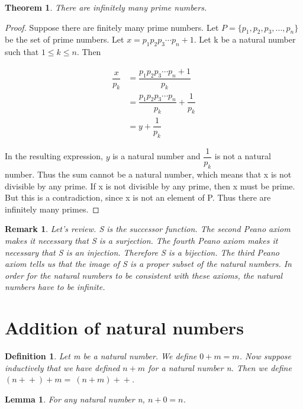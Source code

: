 \documentclass{article}
\newtheorem{definition}{Definition}
\newtheorem{lemma}{Lemma}
\newtheorem{theorem}{Theorem}
\newtheorem{remark}{Remark}
\newcommand{\inc}[1]{#1\!+\!+}
\begin{document}
\begin{theorem}
There are infinitely many prime numbers.
\end{theorem}

\begin{proof}
Suppose there are finitely many prime numbers. Let $P = \{p_{1}, p_{2}, p_{3}, ... ,p_{n}\}$ be the set of prime numbers. Let $x = p_{1}p_{2}p_{3} \dotsm p_{n} + 1$. Let k be a natural number such that $1 \leq k \leq n$. Then 

\begin{align*}
\dfrac{x}{p_{k}} &= \dfrac{p_{1}p_{2}p_{3} \dotsm p_{n} + 1}{p_{k}} \\
&= \dfrac{p_{1}p_{2}p_{3} \dotsm p_{n}}{p_{k}} + \dfrac{1}{p_{k}} \\
&= y + \dfrac{1}{p_{k}}
\end{align*}

In the resulting expression, $y$ is a natural number and $\dfrac{1}{p_{k}}$ is not a natural number. Thus the sum cannot be a natural number, which means that x is not divisible by any prime. If x is not divisible by any prime, then x must be prime. But this is a contradiction, since x is not an element of P. Thus there are infinitely many primes. 
\end{proof}

\begin{remark}
Let's review. S is the successor function. The second Peano axiom makes it necessary that S is a surjection. The fourth Peano axiom makes it necessary that S is an injection. Therefore S is a bijection. The third Peano axiom tells us that the image of S is a proper subset of the natural numbers. In order for the natural numbers to be consistent with these axioms, the natural numbers have to be infinite.
\end{remark}

\section{Addition of natural numbers}

\begin{definition}
Let m be a natural number. We define $0 + m = m$. Now suppose inductively that we have defined $n + m$ for a natural number n. Then we define $(\inc{n}) + m = \ \inc{(n+m)}$. 
\end{definition}

\begin{lemma}
For any natural number n, $n + 0 = n$.
\end{lemma}
\end{document}
